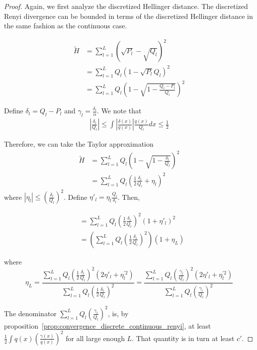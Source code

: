 \documentclass{article}
\begin{document}
\begin{proof}

Again, we first analyze the discretized Hellinger distance. The discretized Renyi divergence can be bounded in terms of the discretized Hellinger distance in the same fashion as the continuous case. 

\begin{align*}
\tilde{H} &= \sum_{l=1}^L (\sqrt{P_l} - \sqrt{Q_l})^2 \\
   &= \sum_{l=1}^L Q_l \left( 1 - \sqrt{P_l}{Q_l} \right)^2 \\
 &= \sum_{l=1}^L Q_l \left( 1 - \sqrt{1 - \frac{Q_l - P_l}{Q_l}} \right)^2 
\end{align*}

Define $\delta_l = Q_l - P_l$ and $\gamma_l = \frac{\delta_l}{\alpha}$. We note that
\begin{align}
\left| \frac{\delta_l}{Q_l} \right| \leq 
   \int \left|\frac{\delta(x)}{q(x)} \right| \frac{q(x)}{Q_l} dx \leq \frac{1}{2}
 \label{eqn:delta_l_q_l_bound}
\end{align}

Therefore, we can take the Taylor approximation
\begin{align*}
\tilde{H} &= \sum_{l=1}^L Q_l \left( 1 - \sqrt{ 1 - \frac{\delta_l}{Q_l}} \right)^2
\\
&= \sum_{l=1}^L Q_l \left( \frac{1}{2} \frac{\delta_l}{Q_l} + \eta_l \right)^2 
\end{align*}
where $|\eta_l| \leq \left( \frac{\delta_l}{Q_l} \right)^2$. Define $\eta'_l = \eta_l \frac{Q_l}{\delta_l}$. Then, 

\begin{align*}
&= \sum_{l=1}^L Q_l \left( \frac{1}{2} \frac{\delta_l}{Q_l} \right)^2 (1 + \eta'_l)^2 \\
&= \left( \sum_{l=1}^L Q_l \left( \frac{1}{2} \frac{\delta_l}{Q_l} \right)^2 \right) ( 1 + \eta_L) 
\end{align*}

where 
\[
\eta_L = \frac{ 
  \sum_{l=1}^L Q_l \left( \frac{1}{2} \frac{\delta_l}{Q_l} \right)^2 (2 \eta'_l + \eta^{\prime 2}_l)}
{\sum_{l=1}^L Q_l \left( \frac{1}{2} \frac{\delta_l}{Q_l} \right)^2} 
 = \frac{ 
  \sum_{l=1}^L Q_l \left( \frac{\gamma_l}{Q_l} \right)^2 (2 \eta'_l + \eta^{\prime 2}_l)}
{\sum_{l=1}^L Q_l \left( \frac{\gamma_l}{Q_l} \right)^2} 
\]

The denominator $\sum_{l=1}^L Q_l \left( \frac{\gamma_l}{Q_l} \right)^2$, is, by proposition~\ref{prop:convergence_discrete_continuous_renyi}, at least 
$ \frac{1}{2} \int q(x) \left( \frac{\gamma(x)}{q(x)} \right)^2$ for all large enough $L$. That quantity is in turn at least $c'$. 


\end{proof}
\end{document}
